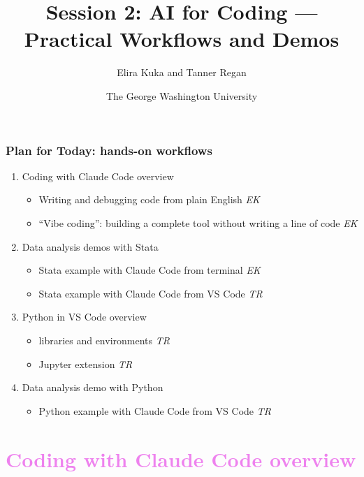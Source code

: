 \documentclass[aspectratio=169, 12pt]{beamer}
\begin{document}
\linespread{1.3}

\title{Session 2: AI for Coding --- Practical Workflows and Demos}
\author[AI for Economists]{Elira Kuka and Tanner Regan}
\date[\today]{The George Washington University}
\maketitle


\begin{frame}
\frametitle{Plan for Today: hands-on workflows}

\begin{enumerate}
    \item Coding with Claude Code overview
    \begin{itemize}
        \item Writing and debugging code from plain English {\color{gray}\it EK}
        \item ``Vibe coding'': building a complete tool without writing a line of code {\color{gray}\it EK}
    \end{itemize}

    \item Data analysis demos with Stata
    \begin{itemize}
        \item Stata example with Claude Code from terminal {\color{gray}\it EK}
        \item Stata example with Claude Code from VS Code {\color{gray}\it TR}
    \end{itemize}

    \item Python in VS Code overview
    \begin{itemize}
        \item libraries and environments {\color{gray}\it TR}
        \item Jupyter extension {\color{gray}\it TR}
    \end{itemize}

    \item Data analysis demo with Python
    \begin{itemize}
        \item Python example with Claude Code from VS Code {\color{gray}\it TR}
    \end{itemize}
\end{enumerate}

\end{frame}


\section{\textcolor{violet}{Coding with Claude Code overview \vspace{0.3in}}}
\end{document}
